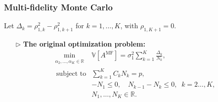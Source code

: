 \documentclass{beamer}
\begin{document}






\begin{frame}[t]
    \frametitle{Multi-fidelity Monte Carlo}
    {\footnotesize Let $\Delta_k = \rho_{1,k}^2 - \rho_{1,k+1}^2$ for $k = 1, \dots, K$, with $\rho_{1,K+1} = 0$.}
    \begin{itemize}[leftmargin=5pt] 
     \vspace{3mm}
        \item[$\triangleright$] \textcolor{myblue3}{\bf The original optimization problem:}
        {\footnotesize
        \begin{equation*}\label{eq:Optimization_pb_sample_size}
            \begin{array}{ll}
            \min \limits_{\begin{array}{c}
        \scriptstyle \alpha_2,\ldots,\alpha_K\in \mathbb{R}
        \end{array}} &\mathbb{V}\left[A^{\text{MF}}\right]=\sigma_1^2\sum_{k=1}^K\frac{\Delta_{k}}{N_k},\\
               \;\,\text{subject to} &\displaystyle\sum\limits_{k=1}^K C_kN_k=p,\\[2pt]
               &\displaystyle -N_1\le 0,\quad \displaystyle N_{k-1}-N_k\le 0, \;\; k=2\ldots,K,\\
               &N_1,\ldots, N_K\in \mathbb{R}. 
            \end{array}
        \end{equation*}
        }


\end{itemize}
\end{frame}
\end{document}

